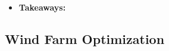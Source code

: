 \documentclass[12pt]{article}
\begin{document}
\begin{itemize}
    \item \textbf{Takeaways:}
\end{itemize}


\subsection{Wind Farm Optimization}

\end{document}
